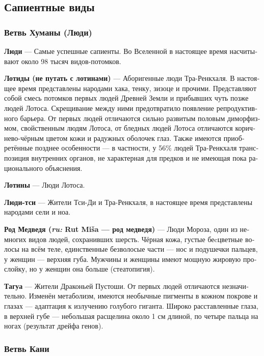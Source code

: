 \documentclass[a4paper,12pt,fleqn]{book}\usepackage{cooltooltips}\usepackage{polyglossia}\setdefaultlanguage[babelshorthands=true]{russian}\setotherlanguage{english}\defaultfontfeatures{Ligatures=TeX,Mapping=tex-text} \usepackage{xcolor}\definecolor{lightgray}{HTML}{bbbbbb}\color{lightgray}\newcommand{\ml}[3]{\textenglish{\textcolor{black}{#3}}}
\newcommand{\asterism}{\vspace{1em}{\centering\Large\bfseries$\ast~\ast~\ast$\par}\vspace{1em}}
\newcommand{\theterm}[3]{\textbf{\hypertarget{#1}{#2}} --- #3}
\newcommand{\theorigin}[3]{\textit{#1:} #2 --- #3}
\begin{document}
\subsection{Сапиентные виды}

\subsubsection{Ветвь Хуманы (Люди)}

\theterm{human-fork}
{Люди}
{Самые успешные сапиенты.
Во Вселенной в настоящее время насчитывают около 98 тысяч видов-потомков.}

\asterism

\theterm{lotids}
{Лотиды (не путать с лотинами)}
{Аборигенные люди Тра-Ренкхаля.
В настоящее время представлены народами хака, тенку, зизоце и прочими.
Представляют собой смесь потомков первых людей Древней Земли и прибывших чуть позже людей Лотоса.
Скрещивание между ними предотвратило появление репродуктивного барьера.
От первых людей отличаются сильно развитым половым диморфизмом, свойственным людям Лотоса, от бледных людей Лотоса отличаются коричнево-чёрным цветом кожи и радужных оболочек глаз.
Также имеются приобретённые позднее особенности --- в частности, у 56\% людей Тра-Ренкхаля транспозиция внутренних органов, не характерная для предков и не имеющая пока рационального объяснения.}

\theterm{lotins}
{Лотины}
{Люди Лотоса.}

\theterm{qi-humans}
{Люди-тси}
{Жители Тси-Ди и Тра-Ренкхаля, в настоящее время представлены народами сели и ноа.}

\theterm{rut-misa}
{Род Медведя (\theorigin{ru}{Rut Mi\v{s}a}{род медведя})}
{Люди Мороза, один из немногих видов людей, сохранивших шерсть.
Чёрная кожа, густые беcцветные волосы на всём теле, единственные безволосые части --- нос и подушечки пальцев, у женщин --- верхняя губа.
Мужчины и женщины имеют мощную жировую прослойку, но у женщин она больше (стеатопигия).}

\theterm{tagua}
{Тагуа}
{Жители Драконьей Пустоши.
От первых людей отличаются незначительно.
Изменён метаболизм, имеются необычные пигменты в кожном покрове и глазах --- адаптация к излучению голубого гиганта.
Широко расставленные глаза, в верхней губе --- небольшая расщелина около 1 см длиной, по четыре пальца на ногах (результат дрейфа генов).}

\subsubsection{Ветвь Кани}
\end{document}
